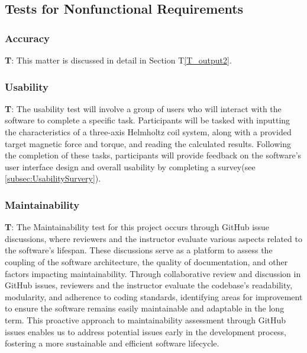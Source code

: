 \documentclass[12pt, titlepage]{article}
\newcounter{testCase}
\newcommand{\testCaseFormat}{T\thetestCase}
\begin{document}
\subsection{Tests for Nonfunctional Requirements}

\subsubsection{Accuracy}\label{subsec:Accuracy}
\textbf{\testCaseFormat \label{T_accu}}: This matter is discussed in detail in Section T\ref{T_output2}.

\subsubsection{Usability}\label{subsec:Usability}
\textbf{\testCaseFormat \label{T_usab}}: The usability test will involve a group of users who will interact with the software to complete a specific task. Participants will be tasked with inputting the characteristics of a three-axis Helmholtz coil system, along with a provided target magnetic force and torque, and reading the calculated results. Following the completion of these tasks, participants will provide feedback on the software's user interface design and overall usability by completing a survey(see \ref{subsec:UsabilitySurvery}).
\subsubsection{Maintainability}\label{subsec:Maintainability}
\textbf{\testCaseFormat \label{T_maint}}: The Maintainability test for this project occurs through GitHub issue discussions, where reviewers and the instructor evaluate various aspects related to the software's lifespan. These discussions serve as a platform to assess the coupling of the software architecture, the quality of documentation, and other factors impacting maintainability. Through collaborative review and discussion in GitHub issues, reviewers and the instructor evaluate the codebase's readability, modularity, and adherence to coding standards, identifying areas for improvement to ensure the software remains easily maintainable and adaptable in the long term. This proactive approach to maintainability assessment through GitHub issues enables us to address potential issues early in the development process, fostering a more sustainable and efficient software lifecycle.
\end{document}
